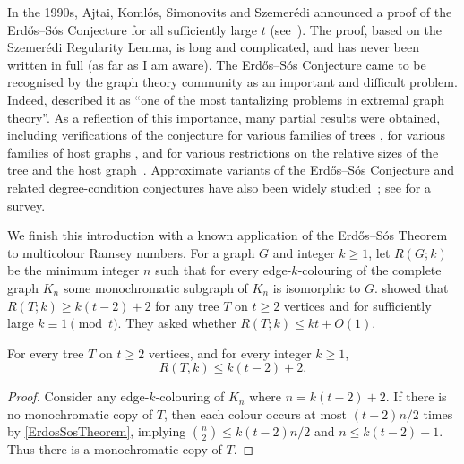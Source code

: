 \documentclass[a4paper,11pt]{article}
\renewcommand{\geq}{\geqslant}
\renewcommand{\leq}{\leqslant}
\begin{document}
In the 1990s, Ajtai, Koml\'os, Simonovits and Szemer\'edi announced a proof of the Erdős--Sós Conjecture for all sufficiently large $t$ (see~\citep{AKSS15}). The proof, based on the Szemer\'edi Regularity Lemma, is long and complicated, and has never been written in full (as far as I am aware). The Erd\H{o}s--S\'os Conjecture came to be recognised by the graph theory community as an important and difficult problem. Indeed, \citet[Section~3.5.1]{CG98} described it as ``one of the most tantalizing problems in extremal graph theory''. As a reflection of this importance, many partial results were obtained, including verifications of the conjecture 
for various families of trees \citep{Pokrovskiy24,Rozhon19,McLennan05,FS07,Sun07,Fan13,Sidorenko89,BPSS21}, 
for various families of host graphs \citep{ReedStein26b,WLL00,Haxell01a,BD96,SW97,ET10,ET13,YL04}, and
for various restrictions on the relative sizes of the tree and the host graph~\citep{Zhou84,Tiner10,Wozniak96,ReedStein26a,GZ16,ReedStein25,STY85}. 
Approximate variants of the Erd\H{o}s--S\'os Conjecture and related degree-condition conjectures have also been widely studied~\citep{DPRS26,DPRS23,BPS20,HRSW20,BPS19,HPSS15,HKPSSS-I,HKPSSS-II,HKPSSS-III,HKPSSS-IV,PiguetStein12}; see \citep{Stein20} for a survey.
 


We finish this introduction with a known \citep{Stein20,ReedStein26a,BPS21} application of the Erdős--Sós Theorem to multicolour Ramsey numbers. For a graph $G$ and integer $k\geq 1$, let $R(G;k)$ be the minimum integer $n$ such that for every edge-$k$-colouring of the complete graph $K_n$ some monochromatic subgraph of $K_n$ is isomorphic to $G$. \citet{ErdosGraham75} showed that $R(T; k) \geq k(t-2) + 2$ for any tree $T$ on $t\geq 2$ vertices and for sufficiently large $k\equiv 1\pmod{t}$. They asked whether $R(T; k) \leq kt + O(1)$. 

\begin{thm}
For every tree $T$ on $t\geq 2$ vertices, and for every integer $k\geq 1$, 
\[R(T,k) \leq k(t-2)+2.\]
\end{thm}

\begin{proof}
Consider any edge-$k$-colouring of $K_n$ where $n=k(t-2)+2$. 
If there is no monochromatic copy of $T$, then each colour occurs at most $(t-2)n/2$ times by \cref{ErdosSosTheorem}, 
implying $\binom{n}{2}\leq k(t-2)n/2$ and $n \leq k(t-2)+1$. Thus there is a monochromatic copy of $T$.
\end{proof}
\end{document}
